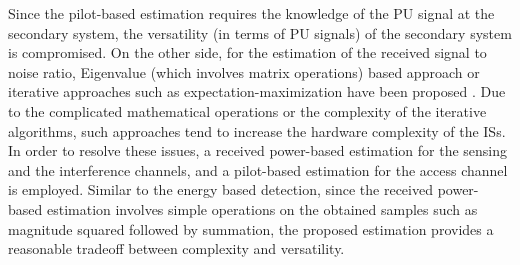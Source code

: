 Since the pilot-based estimation requires the knowledge of the PU signal at the secondary system, the versatility (in terms of PU signals) of the secondary system is compromised. On the other side, for the estimation of the received signal to noise ratio, Eigenvalue (which involves matrix operations) based approach \cite{Sharma13} or iterative approaches such as expectation-maximization have been proposed \cite{Chav11}. Due to the complicated mathematical operations or the complexity of the iterative algorithms, such approaches tend to increase the hardware complexity of the ISs. In order to resolve these issues, a received power-based estimation for the sensing and the interference channels, and a pilot-based estimation for the access channel is employed. Similar to the energy based detection, since the received power-based estimation involves simple operations on the obtained samples such as magnitude squared followed by summation, the proposed estimation provides a reasonable tradeoff between complexity and versatility.


